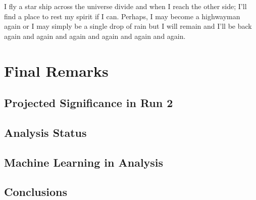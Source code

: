 \begin{savequote}[75mm]
I fly a star ship across the universe divide and when I reach the other side; I'll find a place to rest my spirit if I can. Perhaps, I may become a highwayman again or I may simply be a single drop of rain but I will remain and I'll be back again and again and again and again and again and again.
\end{savequote}

\chapter{Final Remarks}
\label{conclusion}

\section{Projected Significance in Run 2}

\section{Analysis Status}

\section{Machine Learning in Analysis}

\section{Conclusions}